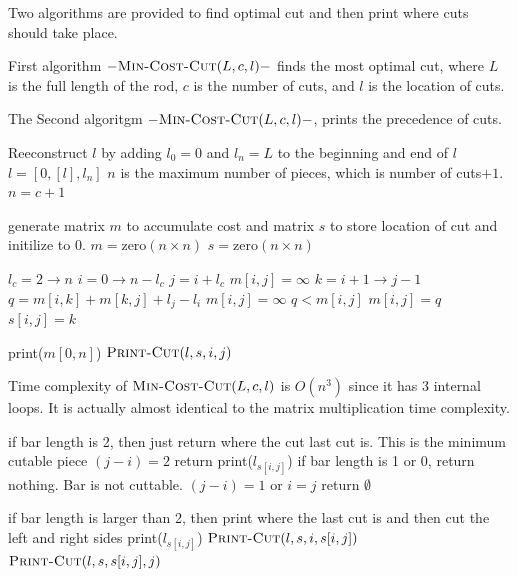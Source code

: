 \documentclass[11pt]{article}
\begin{document}
\begin{enumerate}
	
\pagebreak
	
	Two algorithms are provided to find optimal cut and then print where cuts should take place. 	
	
	First algorithm $-\textnormal{\scshape Min-Cost-Cut}(L,c,l)-$ finds the most optimal cut, where $L$ is the full length of the rod, $c$ is the number of cuts, and $l$ is the location of cuts. 
	
	The Second algoritgm $-\textnormal{\scshape Min-Cost-Cut}(L,c,l)-$, prints the precedence of cuts. 
	
	
	\begin{codebox}
		
		\li \Comment Reeconstruct $l$ by adding $l_0=0$ and $l_n=L$ to the beginning and end of $l$ 
		\li $l=[0,[l],l_n]$
		\li \Comment $n$ is the maximum number of pieces, which is number of cuts$+1$.
		\li $n=c+1$
		
		\li \Comment generate matrix $m$ to accumulate cost and matrix $s$ to store location of cut and initilize to 0.
		\li $m=\mathrm{zero}(n\times n)$
		\li $s=\mathrm{zero}(n\times n)$
		
		\li \For $l_c=2 \rightarrow n$
		\Do	
		\li 	\For $i=0 \rightarrow n-l_c$
		\li 	\Do
					$j=i+l_c$
		\li			$m[i,j]=\infty$
		\li 		\For $k=i+1 \rightarrow j-1$
		\li 		\Do
						$q=m[i,k]+m[k,j]+l_j-l_i$
		\li				$m[i,j]=\infty$
		\li 			\If $q<m[i,j]$
		\li 			\Do	
			                $m[i,j]=q$
		\li	                $s[i,j]=k$

						\End

					\End

				\End
			\End
		\li print($m[0,n]$)
		\li $\proc{Print-Cut}(l,s,i,j)$
		
	\end{codebox}
	
	Time complexity of $\textnormal{\scshape Min-Cost-Cut}(L,c,l)$ is $O(n^3)$ since it has 3 internal loops. It is actually almost identical to the matrix multiplication time complexity. 

	\begin{codebox}
		\Procname{$\proc{Print-Cut}(l,s,i,j)$}
		
		\li \Comment if bar length is 2, then just return where the cut last cut is. This is the minimum cutable piece  
		\li \If $(j-i)=2$
		\li		\Do
					return print($l_{s[i,j]}$) 
				\End
		\li \Comment if bar length is 1 or 0, return nothing. Bar is not cuttable. 
		\li \ElseIf $(j-i)=1$ or $i=j$
		\li		\Do
					return $\emptyset$ 
				
		\li \Comment if bar length is larger than 2, then print where the last cut is and then cut the left and right sides
		\li \Else 
		\li		\Do
			 		print($l_{s[i,j]}$)				
		\li			$\textnormal{\scshape Print-Cut}(l,s,i,s[i,j])$
		\li			$\textnormal{\scshape Print-Cut}(l,s,s[i,j],j)$ 
				\End
		

\end{codebox}
\end{enumerate}
\end{document}
